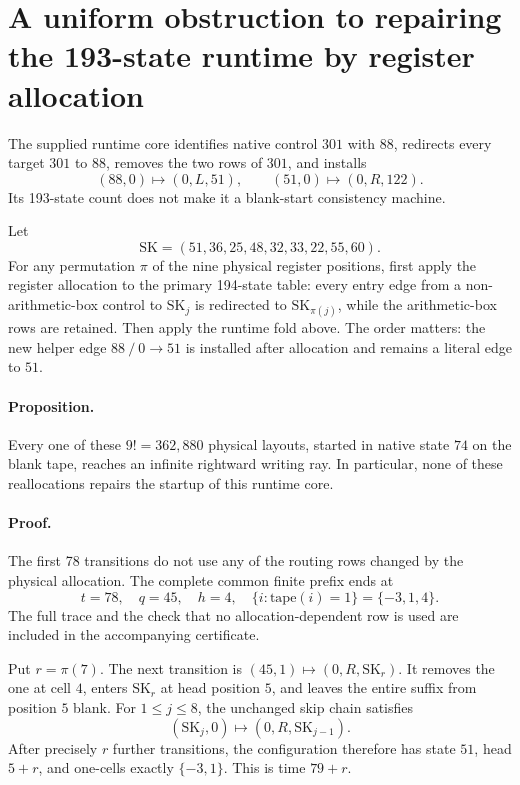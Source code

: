 \section{A uniform obstruction to repairing the 193-state runtime by register allocation}
\label{sec:runtime193-all-layouts}

The supplied runtime core identifies native control \(301\) with \(88\),
redirects every target \(301\) to \(88\), removes the two rows of \(301\),
and installs
\[
 (88,0)\mapsto(0,L,51),\qquad (51,0)\mapsto(0,R,122).
\]
Its 193-state count does not make it a blank-start consistency machine.

Let
\[
 \mathrm{SK}=(51,36,25,48,32,33,22,55,60).
\]
For any permutation \(\pi\) of the nine physical register positions, first
apply the register allocation to the primary 194-state table: every
entry edge from a non-arithmetic-box control to \(\mathrm{SK}_j\) is
redirected to \(\mathrm{SK}_{\pi(j)}\), while the arithmetic-box rows are
retained. Then apply the runtime fold above. The order matters:
the new helper edge \(88\mathbin{/}0\to51\) is installed after allocation
and remains a literal edge to \(51\).

\paragraph{Proposition.}
Every one of these \(9!=362{,}880\) physical layouts, started in native
state \(74\) on the blank tape, reaches an infinite rightward writing
ray. In particular, none of these reallocations repairs the startup
of this runtime core.

\paragraph{Proof.}
The first 78 transitions do not use any of the routing rows changed by
the physical allocation. The complete common finite prefix ends at
\[
 t=78,\quad q=45,\quad h=4,\quad
             \{i:\mathrm{tape}(i)=1\}=\{-3,1,4\}.
\]
The full trace and the check that no allocation-dependent row is used
are included in the accompanying certificate.

Put \(r=\pi(7)\). The next transition is
\((45,1)\mapsto(0,R,\mathrm{SK}_{r})\).
It removes the one at cell \(4\), enters \(\mathrm{SK}_{r}\) at head
position \(5\), and leaves the entire suffix from position \(5\) blank.
For \(1\le j\le8\), the unchanged skip chain satisfies
\[
  (\mathrm{SK}_{j},0)\mapsto(0,R,\mathrm{SK}_{j-1}).
\]
After precisely \(r\) further transitions, the configuration therefore
has state \(51\), head \(5+r\), and one-cells exactly \(\{-3,1\}\).
This is time \(79+r\).

